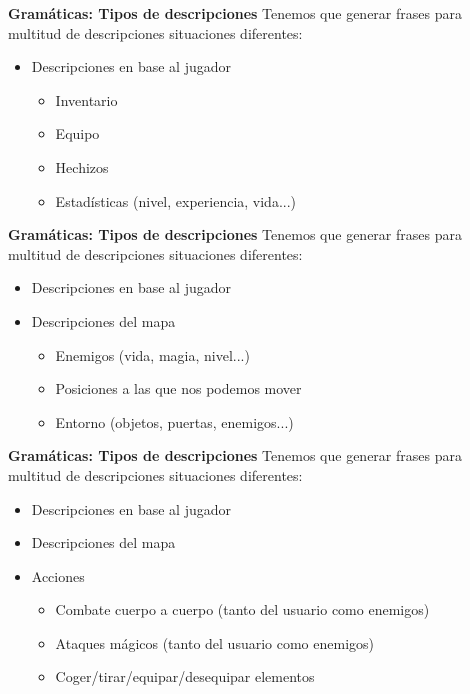 
\begin{frame}[t, fragile]{\textbf{Gramáticas: Tipos de descripciones}}
	Tenemos que generar frases para multitud de descripciones situaciones diferentes:
	\begin{itemize}
		\item<+-| alert@+> Descripciones en base al jugador
			\begin{itemize}
				\item Inventario
				\item Equipo
				\item Hechizos
				\item Estadísticas (nivel, experiencia, vida...)
			\end{itemize}
	\end{itemize}
\end{frame}

\begin{frame}[t, fragile]{\textbf{Gramáticas: Tipos de descripciones}}
	Tenemos que generar frases para multitud de descripciones situaciones diferentes:
	\begin{itemize}
		\item Descripciones en base al jugador
		\item<+-| alert@+> Descripciones del mapa
			\begin{itemize}
				\item Enemigos (vida, magia, nivel...)
				\item Posiciones a las que nos podemos mover
				\item Entorno (objetos, puertas, enemigos...)
			\end{itemize}
	\end{itemize}
\end{frame}

\begin{frame}[t, fragile]{\textbf{Gramáticas: Tipos de descripciones}}
	Tenemos que generar frases para multitud de descripciones situaciones diferentes:
	\begin{itemize}
		\item Descripciones en base al jugador
		\item Descripciones del mapa
		\item<+-| alert@+> Acciones
			\begin{itemize}
				\item Combate cuerpo a cuerpo (tanto del usuario como enemigos)
				\item Ataques mágicos (tanto del usuario como enemigos)
				\item Coger/tirar/equipar/desequipar elementos
			\end{itemize}
	\end{itemize}
\end{frame}

